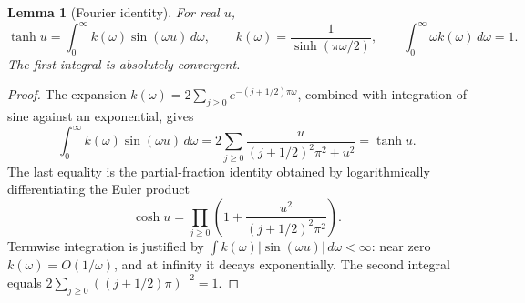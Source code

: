 \documentclass[11pt]{article}
\newtheorem{lemma}[theorem]{Lemma}
\theoremstyle{remark}\newtheorem{remark}[theorem]{Remark}
\begin{document}
\begin{lemma}[Fourier identity]
\label{lem:fourier}
For real $u$,
\[
 \tanh u=\int_0^\infty k(\omega)\sin(\omega u)\,d\omega,
 \qquad k(\omega)=\frac1{\sinh(\pi\omega/2)},
 \qquad \int_0^\infty\omega k(\omega)\,d\omega=1.
\]
The first integral is absolutely convergent.
\end{lemma}
\begin{proof}
The expansion $k(\omega)=2\sum_{j\ge0}e^{-(j+1/2)\pi\omega}$,
combined with integration of sine against an exponential, gives
\[
 \int_0^\infty k(\omega)\sin(\omega u)\,d\omega
 =2\sum_{j\ge0}\frac{u}{(j+1/2)^2\pi^2+u^2}=\tanh u.
\]
The last equality is the partial-fraction identity obtained by
logarithmically differentiating the Euler product
\[
 \cosh u=\prod_{j\ge0}\left(1+\frac{u^2}{(j+1/2)^2\pi^2}\right).
\]
Termwise integration is justified by
$\int k(\omega)|\sin(\omega u)|\,d\omega<\infty$:
near zero $k(\omega)=O(1/\omega)$, and at infinity it decays
exponentially. The second integral equals
$2\sum_{j\ge0}((j+1/2)\pi)^{-2}=1$.
\end{proof}
\end{document}
